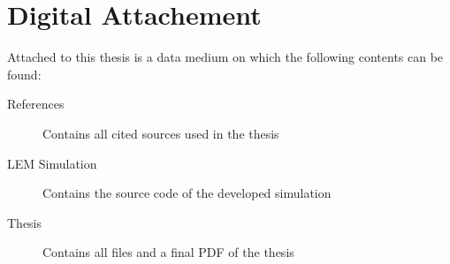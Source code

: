 \section{Digital Attachement}
Attached to this thesis is a data medium on which the following contents can be found:

\begin{description}
    \item[References] Contains all cited sources used in the thesis
    \item[LEM Simulation] Contains the source code of the developed simulation
    \item[Thesis] Contains all files and a final PDF of the thesis
\end{description}


\clearpage